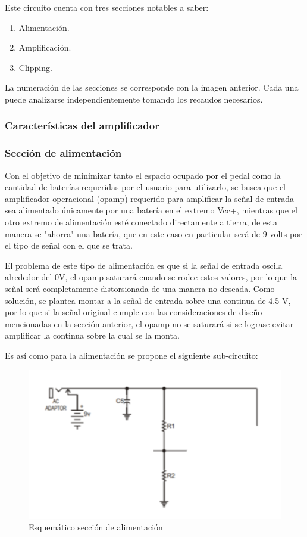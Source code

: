 \documentclass[../../main.tex]{subfiles}
\begin{document}
Este circuito cuenta con tres secciones notables a saber: 
\begin{enumerate}
\item Alimentación.
\item Amplificación.
\item Clipping.
\end{enumerate}
La numeración de las secciones se corresponde con la imagen anterior. Cada una puede analizarse independientemente tomando los recaudos necesarios.

\subsubsection{Caracter\'isticas del amplificador}
\subsubsection{Secci\'on de alimentaci\'on}

Con el objetivo de minimizar tanto el espacio ocupado por el pedal como la cantidad de baterías requeridas por el usuario para utilizarlo, se busca que el amplificador operacional (opamp) requerido para amplificar la señal de entrada sea alimentado únicamente por una batería en el extremo Vcc+, mientras que el otro extremo de alimentación esté conectado directamente a tierra, de esta manera se "ahorra" una batería, que en este caso en particular será de 9 volts por el tipo de señal con el que se trata. \par 
El problema de este tipo de alimentación es que si la señal de entrada oscila alrededor del 0V, el opamp saturará cuando se rodee estos valores, por lo que la señal será completamente distorsionada de una manera no deseada. Como solución, se plantea montar a la señal de entrada sobre una continua de 4.5 V, por lo que si la señal original cumple con las consideraciones de diseño mencionadas en la sección anterior, el opamp no se saturará si se lograse evitar amplificar la continua sobre la cual se la monta. \par
Es así como para la alimentación se propone el siguiente sub-circuito:

\begin{figure}[H]	%
	\centering
	\includegraphics[scale=1]{imagenes/esquematico_alimentacion.png}
	\caption{Esquem\'atico secci\'on de alimentaci\'on}
	\label{fig:ej5_esquematico_alimentacion}
\end{figure}
\end{document}
